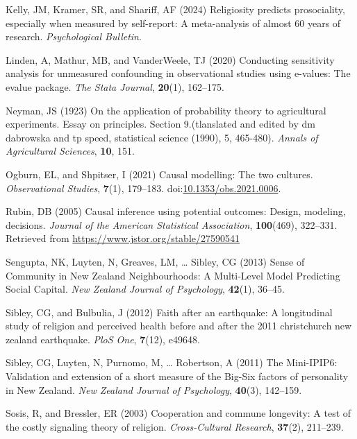 \documentclass[
  single column]{article}
\newlength{\cslhangindent}
\newenvironment{CSLReferences}[2] %
 {\begin{list}{}{%
  \setlength{\itemindent}{0pt}
  \setlength{\leftmargin}{0pt}
  \setlength{\parsep}{0pt}
  \ifodd #1
   \setlength{\leftmargin}{\cslhangindent}
   \setlength{\itemindent}{-1\cslhangindent}
  \fi
  \setlength{\itemsep}{#2\baselineskip}}}
 {\end{list}}
\begin{document}
\begin{CSLReferences}{1}{0}
Kelly, JM, Kramer, SR, and Shariff, AF (2024) Religiosity predicts
prosociality, especially when measured by self-report: A meta-analysis
of almost 60 years of research. \emph{Psychological Bulletin}.

Linden, A, Mathur, MB, and VanderWeele, TJ (2020) Conducting sensitivity
analysis for unmeasured confounding in observational studies using
e-values: The evalue package. \emph{The Stata Journal}, \textbf{20}(1),
162--175.

Neyman, JS (1923) On the application of probability theory to
agricultural experiments. Essay on principles. Section 9.(tlanslated and
edited by dm dabrowska and tp speed, statistical science (1990), 5,
465-480). \emph{Annals of Agricultural Sciences}, \textbf{10}, 151.

Ogburn, EL, and Shpitser, I (2021) Causal modelling: The two cultures.
\emph{Observational Studies}, \textbf{7}(1), 179--183.
doi:\href{https://doi.org/10.1353/obs.2021.0006}{10.1353/obs.2021.0006}.

Rubin, DB (2005) Causal inference using potential outcomes: Design,
modeling, decisions. \emph{Journal of the American Statistical
Association}, \textbf{100}(469), 322--331. Retrieved from
\url{https://www.jstor.org/stable/27590541}

Sengupta, NK, Luyten, N, Greaves, LM, \ldots{} Sibley, CG (2013) Sense
of Community in New Zealand Neighbourhoods: A Multi-Level Model
Predicting Social Capital. \emph{New Zealand Journal of Psychology},
\textbf{42}(1), 36--45.

Sibley, CG, and Bulbulia, J (2012) Faith after an earthquake: A
longitudinal study of religion and perceived health before and after the
2011 christchurch new zealand earthquake. \emph{PloS One},
\textbf{7}(12), e49648.

Sibley, CG, Luyten, N, Purnomo, M, \ldots{} Robertson, A (2011) The
Mini-IPIP6: Validation and extension of a short measure of the Big-Six
factors of personality in New Zealand. \emph{New Zealand Journal of
Psychology}, \textbf{40}(3), 142--159.

Sosis, R, and Bressler, ER (2003) Cooperation and commune longevity: A
test of the costly signaling theory of religion. \emph{Cross-Cultural
Research}, \textbf{37}(2), 211--239.


\end{CSLReferences}
\end{document}
